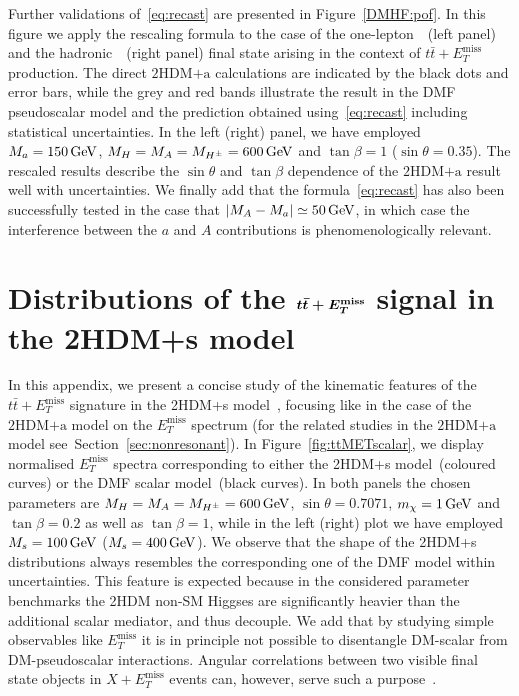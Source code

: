 \documentclass[a4paper, 11pt,notoc]{article}
\newcommand{\MET}{\ensuremath{E_T^\mathrm{miss}}\xspace}
\newcommand{\mA}{\ensuremath{M_{A}}\xspace}
\newcommand{\ma}{\ensuremath{M_{a}}\xspace}
\newcommand{\mH}{\ensuremath{M_{H}}\xspace}
\newcommand{\mHc}{\ensuremath{M_{H^{\pm}}}\xspace}
\newcommand{\hdma}{\ensuremath{\textrm{2HDM+a}}\xspace}
\def\bm#1{\mbox{\boldmath$#1$\unboldmath}}
\begin{document}
Further validations of~\eqref{eq:recast} are presented in Figure~\ref{DMHF:pof}. In this figure we apply the rescaling formula to the case of the  one-lepton~\cite{Aaboud:2017aeu}~(left panel)   and the hadronic~\cite{Aaboud:2017rzf}~(right panel)  final state arising in the context of $t \bar t+\MET$ production. The direct \hdma calculations are indicated by the black dots and error bars, while the grey and red  bands illustrate the result in the DMF pseudoscalar model and the prediction obtained using~\eqref{eq:recast} including statistical uncertainties.  In the left (right) panel, we have employed $\ma = 150 \, {\rm GeV}$, $\mH= \mA = \mHc = 600 \, {\rm GeV}$ and $\tan \beta = 1$ ($\sin\theta=0.35$). The rescaled results describe the $\sin \theta$ and $\tan \beta$ dependence of the \hdma result well with uncertainties.  We finally add that the formula~\eqref{eq:recast} has also been successfully tested in the case that $|\mA - \ma| \simeq 50 \, {\rm GeV}$, in which case the interference between the $a$ and $A$ contributions is phenomenologically relevant.  


\section{Distributions of the $\bm{t \bar t + \MET}$ signal in the 2HDM+s model}
\label{app:ttMETscalar}

In this appendix, we present a concise study of the kinematic features of the  $t \bar t + \MET$ signature in the 2HDM+s model~\cite{Bell:2016ekl,Bell:2017rgi}, focusing like in the case of the  \hdma model on the $\MET$ spectrum (for the related studies in the \hdma model see~Section~\ref{sec:nonresonant}).  In Figure~\ref{fig:ttMETscalar}, we display normalised $\MET$ spectra corresponding to either  the 2HDM+s model~(coloured curves) or the DMF scalar   model~(black curves). In both panels the chosen parameters are $M_H = M_A = M_{H^\pm} = 600 \, {\rm GeV}$, $\sin \theta = 0.7071$, $m_\chi = 1 \, {\rm GeV}$ and $\tan \beta = 0.2$ as well as $\tan \beta = 1$, while in the left (right) plot we have employed $M_s = 100 \, {\rm GeV}$ ($M_s = 400 \, {\rm GeV}$). We observe that  the shape of the 2HDM+s distributions always  resembles  the corresponding one of the DMF model within uncertainties. This feature is expected because in the considered parameter benchmarks the 2HDM non-SM Higgses are significantly heavier than the additional scalar mediator, and thus decouple. We add that by studying simple observables like $\MET$ it is in principle not possible to disentangle DM-scalar from DM-pseudoscalar interactions. Angular correlations between  two visible final state objects in $X+\MET$ events can, however, serve such a purpose~\cite{Haisch:2016gry,Cotta:2012nj,Haisch:2013fla,Crivellin:2015wva}. 
\end{document}

